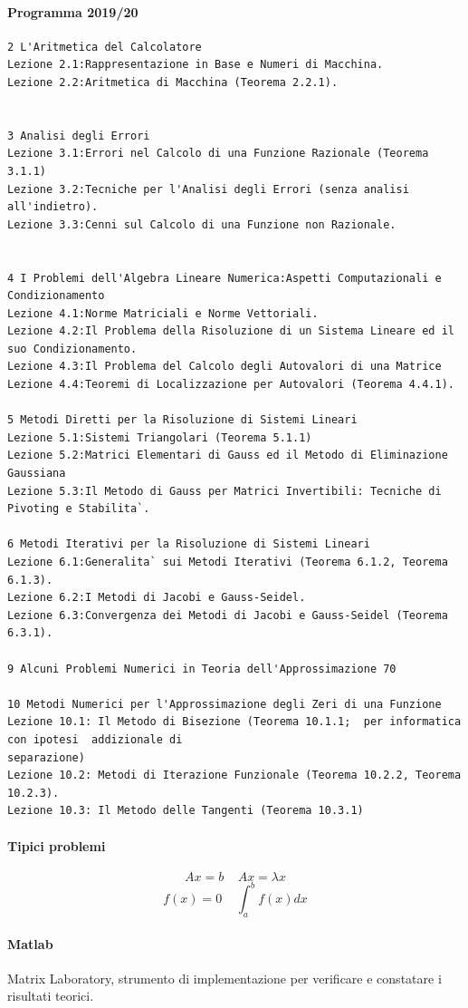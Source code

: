 \documentclass[10pt]{book}
\begin{document}
\paragraph{Programma 2019/20} \begin{verbatim}
2 L'Aritmetica del Calcolatore
Lezione 2.1:Rappresentazione in Base e Numeri di Macchina.
Lezione 2.2:Aritmetica di Macchina (Teorema 2.2.1).


3 Analisi degli Errori
Lezione 3.1:Errori nel Calcolo di una Funzione Razionale (Teorema 3.1.1)
Lezione 3.2:Tecniche per l'Analisi degli Errori (senza analisi all'indietro).
Lezione 3.3:Cenni sul Calcolo di una Funzione non Razionale.


4 I Problemi dell'Algebra Lineare Numerica:Aspetti Computazionali e Condizionamento
Lezione 4.1:Norme Matriciali e Norme Vettoriali.
Lezione 4.2:Il Problema della Risoluzione di un Sistema Lineare ed il
suo Condizionamento.
Lezione 4.3:Il Problema del Calcolo degli Autovalori di una Matrice
Lezione 4.4:Teoremi di Localizzazione per Autovalori (Teorema 4.4.1).

5 Metodi Diretti per la Risoluzione di Sistemi Lineari
Lezione 5.1:Sistemi Triangolari (Teorema 5.1.1)
Lezione 5.2:Matrici Elementari di Gauss ed il Metodo di Eliminazione
Gaussiana
Lezione 5.3:Il Metodo di Gauss per Matrici Invertibili: Tecniche di
Pivoting e Stabilita`.

6 Metodi Iterativi per la Risoluzione di Sistemi Lineari
Lezione 6.1:Generalita` sui Metodi Iterativi (Teorema 6.1.2, Teorema 6.1.3). 
Lezione 6.2:I Metodi di Jacobi e Gauss-Seidel. 
Lezione 6.3:Convergenza dei Metodi di Jacobi e Gauss-Seidel (Teorema 6.3.1).

9 Alcuni Problemi Numerici in Teoria dell'Approssimazione 70

10 Metodi Numerici per l'Approssimazione degli Zeri di una Funzione
Lezione 10.1: Il Metodo di Bisezione (Teorema 10.1.1;  per informatica con ipotesi  addizionale di
separazione)
Lezione 10.2: Metodi di Iterazione Funzionale (Teorema 10.2.2, Teorema 10.2.3).
Lezione 10.3: Il Metodo delle Tangenti (Teorema 10.3.1)

\end{verbatim}
\paragraph{Tipici problemi} $$Ax = b\:\:\:\:\:Ax = \lambda x$$ $$f(x) = 0\:\:\:\:\:\int_a^bf(x) dx$$
\paragraph{Matlab} Matrix Laboratory, strumento di implementazione per verificare e constatare i risultati teorici.
\pagebreak
\end{document}
